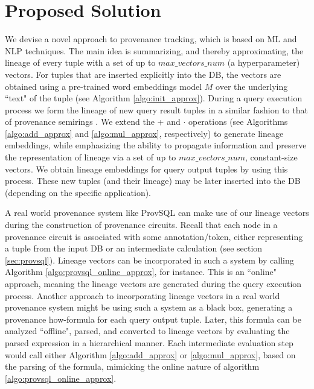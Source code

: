 \section{Proposed Solution}\label{sec:proposed_solution_approx}
\par We devise a novel approach to provenance tracking, which is based on ML and NLP techniques. The main idea is summarizing, and thereby approximating, the lineage of every tuple with a set of up to $max\_vectors\_num$ (a hyperparameter) vectors. For tuples that are inserted explicitly into the DB, the vectors are obtained using a pre-trained word embeddings model $M$ over the underlying ``text" of the tuple (see Algorithm \ref{algo:init_approx}).
During a query execution process we form the lineage of new query result tuples in a similar fashion to that of provenance semirings \cite{green2007provenance}. We extend the + and $\cdot$ operations (see Algorithms \ref{algo:add_approx} and
\ref{algo:mul_approx}, respectively) to generate lineage embeddings, while emphasizing the ability to propagate information and preserve the representation of lineage via a set of up to $max\_vectors\_num$, constant-size vectors. We obtain lineage embeddings for query output tuples by using this process. These new tuples (and their lineage) may be later inserted into the DB (depending on the specific application). 
\par A real world provenance system like ProvSQL \cite{provsql_github} can make use of our lineage vectors during the construction of provenance circuits. Recall that each node in a provenance circuit is associated with some annotation/token, either representing a tuple from the input DB or an intermediate calculation (see section \ref{sec:provsql}). Lineage vectors can be incorporated in such a system by calling Algorithm \ref{algo:provsql_online_approx}, for instance. This is an ``online" approach, meaning the lineage vectors are generated during the query execution process. Another approach to incorporating lineage vectors in a real world provenance system might be using such a system as a black box, generating a provenance how-formula for each query output tuple. Later, this formula can be analyzed ``offline", parsed, and converted to lineage vectors by evaluating the parsed expression in a hierarchical manner. Each intermediate evaluation step would call either Algorithm \ref{algo:add_approx} or \ref{algo:mul_approx}, based on the parsing of the formula, mimicking the online nature of algorithm \ref{algo:provsql_online_approx}.


